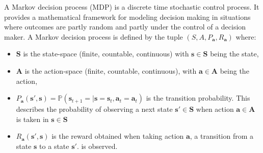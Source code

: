 \documentclass[]{usiinfdocprop}
\newcommand{\bb}[1]{\boldsymbol{\mathbf{#1}}}
\begin{document}
A Markov decision process (MDP) is a discrete time stochastic control process. It provides a mathematical framework for modeling decision making in situations where outcomes are partly random and partly under the control of a decision maker. A Markov decision process is defined by the tuple $(S,A,P_{\bb{a}},R_{\bb{a}})$ where:
\begin{itemize}
    \item $\bb{S}$ is the state-space (finite, countable, continuous) with $\bb{s} \in \bb{S}$ being the state,
    \item $\bb{A}$ is the action-space (finite, countable, continuous), with $\bb{a} \in \bb{A}$ being the action,
    \item $P_{\bb{a}}(\bb{s}',\bb{s})=\mathbb{P}(\bb{s}_{t+1}=|\bb{s}=\bb{s}_{t},\bb{a}_t=\bb{a}_{t})$ is the transition probability. This describes the probability of observing a next state $\bb{s}' \in \bb{S}$ when action $\bb{a} \in \bb{A}$ is taken in $\bb{s} \in \bb{S}$

    \item $R_{\bb{a}}(\bb{s}',\bb{s})$ is the reward obtained when taking action $\bb{a}$, a transition from a state $\bb{s}$ to a state $\bb{s}'$.
is observed.
\end{itemize}
\end{document}
